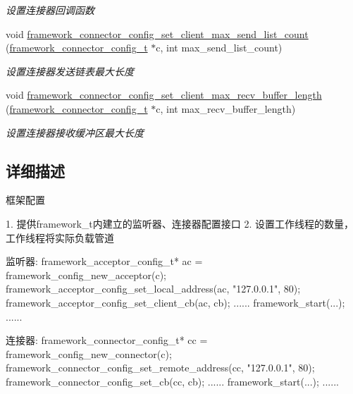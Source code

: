 \begin{DoxyCompactItemize}
\begin{DoxyCompactList}\small\item\em 设置连接器回调函数 \end{DoxyCompactList}\item 
void \hyperlink{a00103_ga0afe3e1f2612f39667940fc336312cb9_ga0afe3e1f2612f39667940fc336312cb9}{framework\+\_\+connector\+\_\+config\+\_\+set\+\_\+client\+\_\+max\+\_\+send\+\_\+list\+\_\+count} (\hyperlink{a00050_a81253f4c995b97e69be0e67f7a26097f_a81253f4c995b97e69be0e67f7a26097f}{framework\+\_\+connector\+\_\+config\+\_\+t} $\ast$c, int max\+\_\+send\+\_\+list\+\_\+count)
\begin{DoxyCompactList}\small\item\em 设置连接器发送链表最大长度 \end{DoxyCompactList}\item 
void \hyperlink{a00103_ga2b6beeacea30cd3aacb8802bb0323476_ga2b6beeacea30cd3aacb8802bb0323476}{framework\+\_\+connector\+\_\+config\+\_\+set\+\_\+client\+\_\+max\+\_\+recv\+\_\+buffer\+\_\+length} (\hyperlink{a00050_a81253f4c995b97e69be0e67f7a26097f_a81253f4c995b97e69be0e67f7a26097f}{framework\+\_\+connector\+\_\+config\+\_\+t} $\ast$c, int max\+\_\+recv\+\_\+buffer\+\_\+length)
\begin{DoxyCompactList}\small\item\em 设置连接器接收缓冲区最大长度 \end{DoxyCompactList}\end{DoxyCompactItemize}


\subsection{详细描述}
框架配置 


\begin{DoxyPre}
1. 提供framework\_t内建立的监听器、连接器配置接口
2. 设置工作线程的数量，工作线程将实际负载管道\end{DoxyPre}



\begin{DoxyPre}监听器:
    framework\_acceptor\_config\_t* ac = framework\_config\_new\_acceptor(c);
    framework\_acceptor\_config\_set\_local\_address(ac, "127.0.0.1", 80);
    framework\_acceptor\_config\_set\_client\_cb(ac, cb);
    ......
    framework\_start(...);
    ......\end{DoxyPre}



\begin{DoxyPre}连接器:
    framework\_connector\_config\_t* cc = framework\_config\_new\_connector(c);
    framework\_connector\_config\_set\_remote\_address(cc, "127.0.0.1", 80);
    framework\_connector\_config\_set\_cb(cc, cb);
    ......
    framework\_start(...);
    ......\end{DoxyPre}




